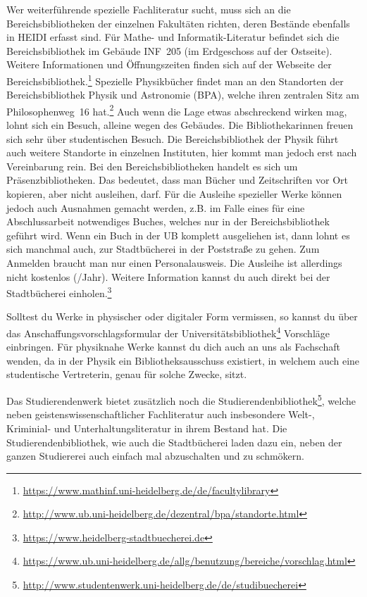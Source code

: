 Wer weiterführende spezielle Fachliteratur sucht, muss sich an die Bereichsbibliotheken der einzelnen Fakultäten richten, deren Bestände ebenfalls in \gls{HEIDI} erfasst sind. Für Mathe- und Informatik-Literatur befindet sich die Bereichsbibliothek im Gebäude \gls{INF}~205 (im Erdgeschoss auf der Ostseite). Weitere Informationen und Öffnungszeiten finden sich auf der Webseite der Bereichsbibliothek.\footnote{\url{https://www.mathinf.uni-heidelberg.de/de/facultylibrary}} Spezielle Physikbücher findet man an den Standorten der Bereichsbibliothek Physik und Astronomie (BPA), welche ihren zentralen Sitz am Philosophenweg~16 hat.\footnote{\url{http://www.ub.uni-heidelberg.de/dezentral/bpa/standorte.html}} Auch wenn die Lage etwas abschreckend wirken mag, lohnt sich ein Besuch, alleine wegen des Gebäudes. Die Bibliothekarinnen freuen sich sehr über studentischen Besuch. Die Bereichsbibliothek der Physik führt auch weitere Standorte in einzelnen Instituten, hier kommt man jedoch erst nach Vereinbarung rein.
Bei den Bereichsbibliotheken handelt es sich um Präsenzbibliotheken. Das bedeutet, dass man Bücher und Zeitschriften vor Ort kopieren, aber nicht ausleihen, darf. Für die Ausleihe spezieller Werke können jedoch auch Ausnahmen gemacht werden, z.B. im Falle eines für eine Abschlussarbeit notwendiges Buches, welches nur in der Bereichsbibliothek geführt wird.
Wenn ein Buch in der UB komplett ausgeliehen ist, dann lohnt es sich manchmal auch, zur Stadtbücherei in der Poststraße zu gehen. Zum Anmelden braucht man nur einen Personalausweis. Die Ausleihe ist allerdings nicht kostenlos (/Jahr). Weitere Information kannst du auch direkt bei der Stadtbücherei einholen.\footnote{\url{https://www.heidelberg-stadtbuecherei.de}}

Solltest du Werke in physischer oder digitaler Form vermissen, so kannst du über das Anschaffungsvorschlagsformular der Universitätsbibliothek\footnote{\url{https://www.ub.uni-heidelberg.de/allg/benutzung/bereiche/vorschlag.html}} Vorschläge einbringen. Für physiknahe Werke kannst du dich auch an uns als Fachschaft wenden, da in der Physik ein Bibliotheksausschuss existiert, in welchem auch eine studentische Vertreterin, genau für solche Zwecke, sitzt.


Das Studierendenwerk bietet zusätzlich noch die Studierendenbibliothek\footnote{\url{http://www.studentenwerk.uni-heidelberg.de/de/studibuecherei}}, welche neben geistenswissenschaftlicher Fachliteratur auch insbesondere Welt-, Kriminial- und Unterhaltungsliteratur in ihrem Bestand hat. Die Studierendenbibliothek, wie auch die Stadtbücherei laden dazu ein, neben der ganzen Studiererei auch einfach mal abzuschalten und zu schmökern.
